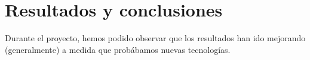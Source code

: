 \section{Resultados y conclusiones}

Durante el proyecto, hemos podido observar que los resultados han ido mejorando (generalmente) a medida que probábamos nuevas tecnologías. 